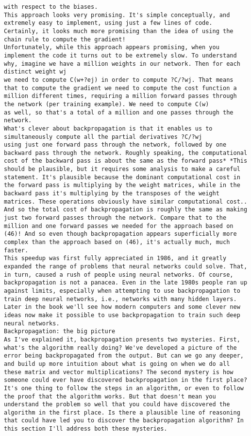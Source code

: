 \begin{lstlisting}
with respect to the biases.
This approach looks very promising. It's simple conceptually, and extremely easy to implement, using just a few lines of code. Certainly, it looks much more promising than the idea of using the chain rule to compute the gradient!
Unfortunately, while this approach appears promising, when you implement the code it turns out to be extremely slow. To understand why, imagine we have a million weights in our network. Then for each distinct weight wj
we need to compute C(w+?ej) in order to compute ?C/?wj. That means that to compute the gradient we need to compute the cost function a million different times, requiring a million forward passes through the network (per training example). We need to compute C(w)
as well, so that's a total of a million and one passes through the network.
What's clever about backpropagation is that it enables us to simultaneously compute all the partial derivatives ?C/?wj
using just one forward pass through the network, followed by one backward pass through the network. Roughly speaking, the computational cost of the backward pass is about the same as the forward pass* *This should be plausible, but it requires some analysis to make a careful statement. It's plausible because the dominant computational cost in the forward pass is multiplying by the weight matrices, while in the backward pass it's multiplying by the transposes of the weight matrices. These operations obviously have similar computational cost.. And so the total cost of backpropagation is roughly the same as making just two forward passes through the network. Compare that to the million and one forward passes we needed for the approach based on (46)! And so even though backpropagation appears superficially more complex than the approach based on (46), it's actually much, much faster.
This speedup was first fully appreciated in 1986, and it greatly expanded the range of problems that neural networks could solve. That, in turn, caused a rush of people using neural networks. Of course, backpropagation is not a panacea. Even in the late 1980s people ran up against limits, especially when attempting to use backpropagation to train deep neural networks, i.e., networks with many hidden layers. Later in the book we'll see how modern computers and some clever new ideas now make it possible to use backpropagation to train such deep neural networks.
Backpropagation: the big picture
As I've explained it, backpropagation presents two mysteries. First, what's the algorithm really doing? We've developed a picture of the error being backpropagated from the output. But can we go any deeper, and build up more intuition about what is going on when we do all these matrix and vector multiplications? The second mystery is how someone could ever have discovered backpropagation in the first place? It's one thing to follow the steps in an algorithm, or even to follow the proof that the algorithm works. But that doesn't mean you understand the problem so well that you could have discovered the algorithm in the first place. Is there a plausible line of reasoning that could have led you to discover the backpropagation algorithm? In this section I'll address both these mysteries.

\end{lstlisting}
